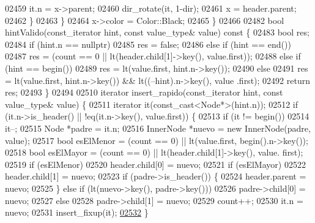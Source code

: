 \begin{DoxyCode}
02459                 it.n = x->parent;
02460                 dir\_rotate(it, 1-dir);
02461                 x = header.parent;
02462             \}
02463         \}
02464         x->color = Color::Black;
02465     \}
02466 
02482     \textcolor{keywordtype}{bool} hintValido(const\_iterator hint, \textcolor{keyword}{const} value\_type& value)\textcolor{keyword}{ const }\{
02483         \textcolor{keywordtype}{bool} res;
02484         \textcolor{keywordflow}{if} (hint.n == \textcolor{keyword}{nullptr})
02485             res = \textcolor{keyword}{false};
02486         \textcolor{keywordflow}{else} \textcolor{keywordflow}{if} (hint == end())
02487             res = (count == 0 || lt(header.child[1]->key(), value.first));
02488         \textcolor{keywordflow}{else} \textcolor{keywordflow}{if} (hint == begin())
02489             res = lt(value.first, hint.n->key());
02490         \textcolor{keywordflow}{else}
02491             res = lt(value.first, hint.n->key()) && lt((--hint).n->key(), value
      .first);
02492         \textcolor{keywordflow}{return} res;
02493     \}
02494 
02510     iterator insert\_rapido(const\_iterator hint, \textcolor{keyword}{const} value\_type& value) \{
02511         iterator it(const\_cast<Node*>(hint.n));
02512         \textcolor{keywordflow}{if} (it.n->is\_header() || !eq(it.n->key(), value.first)) \{
02513             \textcolor{keywordflow}{if} (it != begin())
02514                 it--;
02515             Node *padre = it.n;
02516             InnerNode *nuevo = \textcolor{keyword}{new} InnerNode(padre, value);
02517             \textcolor{keywordtype}{bool} esElMenor = (count == 0) || lt(value.first, begin().n->key());
02518             \textcolor{keywordtype}{bool} esElMayor = (count == 0) || lt(header.child[1]->key(), value.
      first);
02519             \textcolor{keywordflow}{if} (esElMenor)
02520                 header.child[0] = nuevo;
02521             \textcolor{keywordflow}{if} (esElMayor)
02522                 header.child[1] = nuevo;
02523             \textcolor{keywordflow}{if} (padre->is\_header()) \{
02524                 header.parent = nuevo;
02525             \} \textcolor{keywordflow}{else} \textcolor{keywordflow}{if} (lt(nuevo->key(), padre->key()))
02526                 padre->child[0] = nuevo;
02527             \textcolor{keywordflow}{else}
02528                 padre->child[1] = nuevo;
02529             count++;
02530             it.n = nuevo;
02531             insert\_fixup(it);
\hypertarget{map_8h_source_l02532}{}\hyperlink{classaed2_1_1map_a98aadc6fb2ac8f51567a98473a90c30f_a98aadc6fb2ac8f51567a98473a90c30f}{02532}         \}

\end{DoxyCode}
